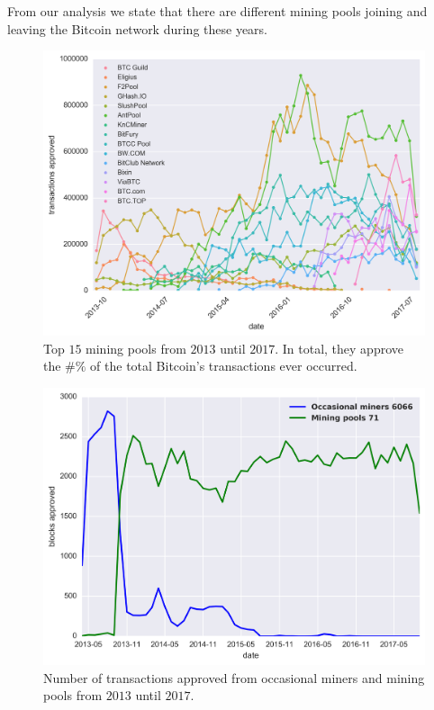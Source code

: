 \documentclass[USenglish]{uit-thesis}
\begin{document}
From our analysis we state that there are different mining pools
joining and leaving the Bitcoin network during these years.
\begin{figure}[h]
	\centering
	\includegraphics[width=1\linewidth]{img/trendy_miners}
	\caption{Top $15$ mining pools from $2013$ until $2017$. In total, they approve the $\#\%$
	of the total Bitcoin's transactions ever occurred.}
	\label{fig:trendy_miners}
\end{figure}
\begin{figure}[h]
	\centering
	\includegraphics[width=1\textwidth]{img/top_miners_monthly}
	\caption{Number of transactions approved from occasional miners and mining pools from $2013$ until $2017$.}
	\label{fig:top_miners_monthly}
\end{figure}
\end{document}
